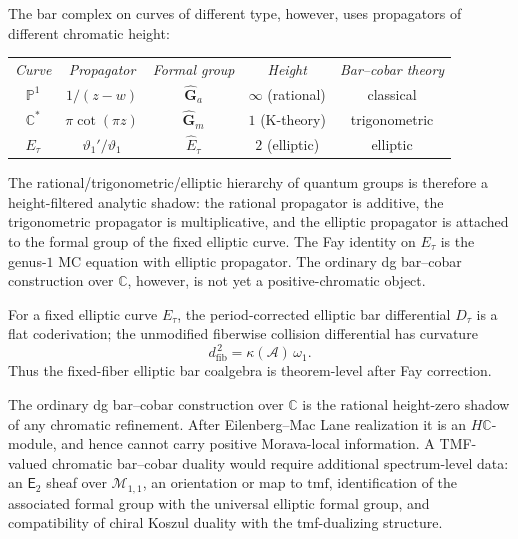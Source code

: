 \documentclass[11pt]{article}
\newcommand{\cA}{\mathcal{A}}
\newcommand{\C}{\mathbb{C}}
\newcommand{\bP}{\mathbb{P}}
\newcommand{\Etwo}{\mathsf{E}_2}
\begin{document}
The bar complex on curves of different type, however, uses
propagators of different chromatic height:
\begin{center}
\renewcommand{\arraystretch}{1.4}
\begin{tabular}{@{}ccccc@{}}
\emph{Curve} & \emph{Propagator} & \emph{Formal group}
  & \emph{Height} & \emph{Bar--cobar theory} \\[3pt]
$\bP^1$ & $1/(z-w)$ & $\hat{\mathbf{G}}_a$
  & $\infty$ (rational) & classical \\
$\C^*$ & $\pi\cot(\pi z)$ & $\hat{\mathbf{G}}_m$
  & $1$ (K-theory) & trigonometric \\
$E_\tau$ & $\vartheta_1'/\vartheta_1$ & $\hat{E}_\tau$
  & $2$ (elliptic) & elliptic
\end{tabular}
\end{center}

\noindent
The rational/trigonometric/elliptic hierarchy of quantum groups is
therefore a height-filtered analytic shadow: the rational
propagator is additive, the trigonometric propagator is
multiplicative, and the elliptic propagator is attached to the
formal group of the fixed elliptic curve.  The Fay identity on
$E_\tau$ is the genus-$1$ MC equation with elliptic propagator.
The ordinary dg bar--cobar construction over $\C$, however, is
not yet a positive-chromatic object.

\begin{theorem}
\label{thm:chromatic-height-zero-obstruction}
For a fixed elliptic curve $E_\tau$, the period-corrected
elliptic bar differential $D_\tau$ is a flat coderivation; the
unmodified fiberwise collision differential has curvature
\[
  d_{\mathrm{fib}}^{\,2}=\kappa(\cA)\,\omega_1 .
\]
Thus the fixed-fiber elliptic bar coalgebra is theorem-level
after Fay correction.

The ordinary dg bar--cobar construction over $\C$ is the
rational height-zero shadow of any chromatic refinement.  After
Eilenberg--Mac Lane realization it is an $H\C$-module, and hence
cannot carry positive Morava-local information.  A
TMF-valued chromatic bar--cobar duality would require additional
spectrum-level data: an $\Etwo$ sheaf over $\mathcal M_{1,1}$,
an orientation or map to $\mathrm{tmf}$, identification of the
associated formal group with the universal elliptic formal group,
and compatibility of chiral Koszul duality with the
tmf-dualizing structure.
\end{theorem}
\end{document}

